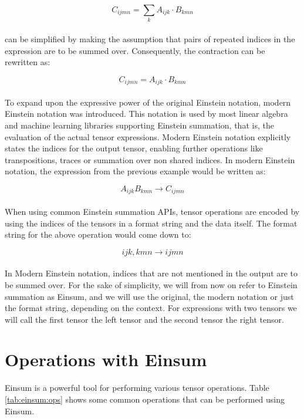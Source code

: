 \[C_{ijmn} = \sum_{k}A_{ijk} \cdot B_{kmn}\]
\noindent
\\
can be simplified by making the assumption that pairs of repeated indices in the expression
are to be summed over. Consequently, the contraction can be rewritten as:

\[C_{ijmn} = A_{ijk} \cdot B_{kmn}\]
\noindent
\\
To expand upon the expressive power of the original Einstein notation, modern Einstein
notation was introduced. This notation is used by most linear algebra and machine
learning libraries supporting Einstein summation, that is, the evaluation of the actual
tensor expressions. Modern Einstein notation explicitly states the indices for the
output tensor, enabling further operations like transpositions, traces or summation
over non shared indices. In modern Einstein notation, the expression from the previous
example would be written as:

\[A_{ijk}B_{kmn} \rightarrow C_{ijmn}\]
\noindent
\\
When using common Einstein summation APIs, tensor operations are encoded by using the
indices of the tensors in a format string and the data itself.
\newpage
\noindent
The format string for the above operation would come down to:

\[ijk,kmn \rightarrow ijmn\]
\noindent
\\
In Modern Einstein notation, indices that are not mentioned in the output are to be
summed over. For the sake of simplicity, we will from now on refer to Einstein summation
as Einsum, and we will use the original, the modern notation or just the format
string, depending on the context. For expressions with two tensors we will call the first
tensor the left tensor and the second tensor the right tensor.

\section{Operations with Einsum}
Einsum is a powerful tool for performing various tensor operations. Table \ref{tab:einsum:ops}
shows some common operations that can be performed using Einsum.

